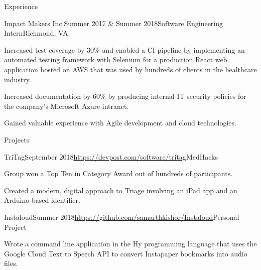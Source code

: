 \documentclass{resume}
\begin{document}
\begin{rSection}{Experience}
  \begin{rSubsection}{Impact Makers Inc.}{Summer 2017 \& Summer 2018}{Software Engineering Intern}{Richmond, VA}
    \item Increased test coverage by 30\% and enabled a CI pipeline by implementing an automated testing framework with Selenium for a production React web application hosted on AWS that was used by hundreds of clients in the healthcare industry.
    \item Increased documentation by 60\% by producing internal IT security policies for the company's Microsoft Azure intranet.
    \item  Gained valuable experience with Agile development and cloud technologies.
  \end{rSubsection}

\end{rSection}

\begin{rSection}{Projects}

  \begin{rSubsection}{TriTag}{September 2018}{\url{https://devpost.com/software/tritag}}{MedHacks}
    \item Group won a Top Ten in Category Award out of hundreds of participants.
    \item Created a modern, digital approach to Triage involving an iPad app and an Arduino-based identifier.
  \end{rSubsection}

  \begin{rSubsection}{Instaloud}{Summer 2018}{\url{https://github.com/samarthkishor/Instaloud}}{Personal Project}
    \item Wrote a command line application in the Hy programming language that uses the Google Cloud Text to Speech API to convert Instapaper bookmarks into audio files.
  \end{rSubsection}

\end{rSection}
\end{document}
